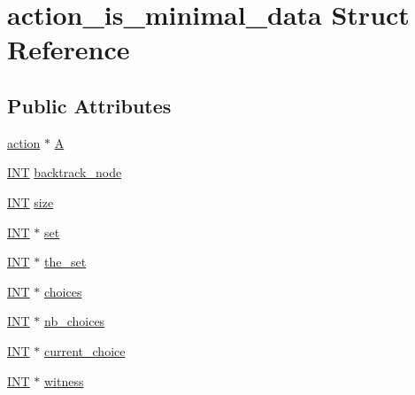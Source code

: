 \hypertarget{structaction__is__minimal__data}{}\section{action\+\_\+is\+\_\+minimal\+\_\+data Struct Reference}
\label{structaction__is__minimal__data}
\subsection*{Public Attributes}
\begin{DoxyCompactItemize}
\item 
\mbox{\hyperlink{classaction}{action}} $\ast$ \mbox{\hyperlink{structaction__is__minimal__data_a3336fd04c5af26ca5fcab84fc69bab2e}{A}}
\item 
\mbox{\hyperlink{galois_8h_a09fddde158a3a20bd2dcadb609de11dc}{I\+NT}} \mbox{\hyperlink{structaction__is__minimal__data_a1c292942dbddb9039bf13648505a9f33}{backtrack\+\_\+node}}
\item 
\mbox{\hyperlink{galois_8h_a09fddde158a3a20bd2dcadb609de11dc}{I\+NT}} \mbox{\hyperlink{structaction__is__minimal__data_abd585987fab9e6be254c2ff841436533}{size}}
\item 
\mbox{\hyperlink{galois_8h_a09fddde158a3a20bd2dcadb609de11dc}{I\+NT}} $\ast$ \mbox{\hyperlink{structaction__is__minimal__data_ae60de1cdd7222edfb6b54122afb3013f}{set}}
\item 
\mbox{\hyperlink{galois_8h_a09fddde158a3a20bd2dcadb609de11dc}{I\+NT}} $\ast$ \mbox{\hyperlink{structaction__is__minimal__data_a9c0178edaab59efc39c12a57523d61a6}{the\+\_\+set}}
\item 
\mbox{\hyperlink{galois_8h_a09fddde158a3a20bd2dcadb609de11dc}{I\+NT}} $\ast$ \mbox{\hyperlink{structaction__is__minimal__data_a15eed37f304d928ee3a99e9dad070d7d}{choices}}
\item 
\mbox{\hyperlink{galois_8h_a09fddde158a3a20bd2dcadb609de11dc}{I\+NT}} $\ast$ \mbox{\hyperlink{structaction__is__minimal__data_a4b2d4ddd41a0f1a872cab2b49cb57b67}{nb\+\_\+choices}}
\item 
\mbox{\hyperlink{galois_8h_a09fddde158a3a20bd2dcadb609de11dc}{I\+NT}} $\ast$ \mbox{\hyperlink{structaction__is__minimal__data_a0dbf24ec008521c6461def32595954ab}{current\+\_\+choice}}
\item 
\mbox{\hyperlink{galois_8h_a09fddde158a3a20bd2dcadb609de11dc}{I\+NT}} $\ast$ \mbox{\hyperlink{structaction__is__minimal__data_a79a870387085b72696c205e962b745db}{witness}}
\item 

\end{DoxyCompactItemize}
